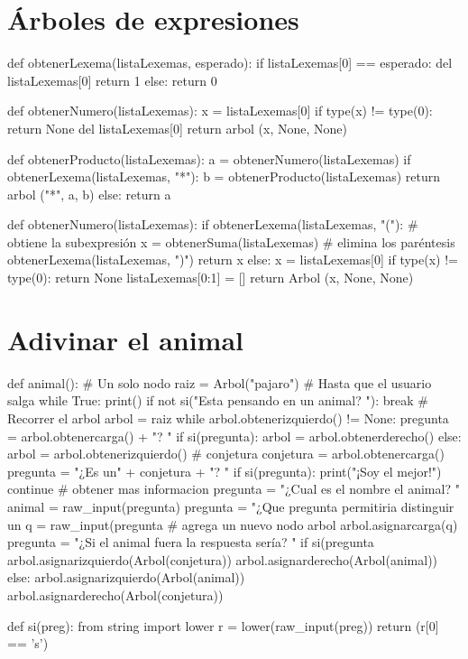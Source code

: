\section{Árboles de expresiones}

\begin{pythoncode}
def obtenerLexema(listaLexemas, esperado):
  if listaLexemas[0] == esperado:
      del listaLexemas[0]
      return 1
  else:
      return 0

def obtenerNumero(listaLexemas):
  x = listaLexemas[0]
  if type(x) != type(0):
      return None
  del listaLexemas[0]
  return arbol (x, None, None)


def obtenerProducto(listaLexemas):
  a = obtenerNumero(listaLexemas)
  if obtenerLexema(listaLexemas, "*"):
    b = obtenerProducto(listaLexemas) 
    return arbol ("*", a, b)
  else:
    return a

def obtenerNumero(listaLexemas):
  if obtenerLexema(listaLexemas, "("):
    # obtiene la subexpresión
    x = obtenerSuma(listaLexemas) 
    # elimina los paréntesis
    obtenerLexema(listaLexemas, ")") 
    return x
  else:
    x = listaLexemas[0]
    if type(x) != type(0):
      return None
    listaLexemas[0:1] = []
   return Arbol (x, None, None)  
\end{pythoncode}

\section{Adivinar el animal}

\begin{pythoncode}
def animal():
  # Un solo nodo
  raiz = Arbol("pajaro")
      # Hasta que el usuario salga
  while True:
    print()
    if not si("Esta pensando en un animal? "):
    break
    # Recorrer el arbol
    arbol = raiz
    while arbol.obtenerizquierdo() != None:
      pregunta = arbol.obtenercarga() + "? "
      if si(pregunta):
      arbol = arbol.obtenerderecho()
      else:
      arbol = arbol.obtenerizquierdo()
    # conjetura
    conjetura = arbol.obtenercarga()
    pregunta = "¿Es un" + conjetura + "? "
    if si(pregunta):
      print("¡Soy el mejor!")
      continue
    # obtener mas informacion
    pregunta = "¿Cual es el nombre el animal? "
    animal = raw_input(pregunta)
    pregunta = "¿Que pregunta permitiria distinguir 
        un %
    q = raw_input(pregunta %
    # agrega un nuevo nodo arbol
    arbol.asignarcarga(q)
    pregunta = "¿Si el animal fuera %
        la respuesta sería? "
    if si(pregunta %
      arbol.asignarizquierdo(Arbol(conjetura))
      arbol.asignarderecho(Arbol(animal))
    else:
      arbol.asignarizquierdo(Arbol(animal))
      arbol.asignarderecho(Arbol(conjetura))

def si(preg):
  from string import lower
  r = lower(raw_input(preg))
  return (r[0] == 's')
\end{pythoncode}

